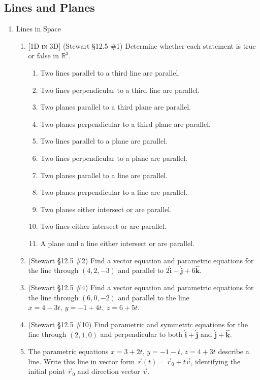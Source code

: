 \documentclass[12pt]{article}
\newcommand{\ihat}{\hat{\textbf{i}}}
\newcommand{\jhat}{\hat{\textbf{j}}}
\newcommand{\khat}{\hat{\textbf{k}}}
\newcommand{\dimtag}[1]{{\footnotesize\textsc{[#1]}}\;}
\newcounter{topic}
\begin{document}
\subsection*{Lines and Planes}
\begin{enumerate}\setcounter{enumi}{\value{topic}}

\item Lines in Space
    \begin{enumerate}
        \item \dimtag{1D in 3D} (Stewart \S12.5 \#1) Determine whether each statement is true or false in $\mathbb{R}^3$.
        \begin{enumerate}
            \item Two lines parallel to a third line are parallel.
            \item Two lines perpendicular to a third line are parallel.
            \item Two planes parallel to a third plane are parallel.
            \item Two planes perpendicular to a third plane are parallel.
            \item Two lines parallel to a plane are parallel.
            \item Two lines perpendicular to a plane are parallel.
            \item Two planes parallel to a line are parallel.
            \item Two planes perpendicular to a line are parallel.
            \item Two planes either intersect or are parallel.
            \item Two lines either intersect or are parallel.
            \item A plane and a line either intersect or are parallel.
        \end{enumerate}
        \item (Stewart \S12.5 \#2) Find a vector equation and parametric equations for the line through $(4,2,-3)$ and parallel to $2\ihat - \jhat + 6\khat$.
        \item (Stewart \S12.5 \#4) Find a vector equation and parametric equations for the line through $(6,0,-2)$ and parallel to the line $x=4-3t,\ y=-1+4t,\ z=6+5t$.
        \item (Stewart \S12.5 \#10) Find parametric and symmetric equations for the line through $(2,1,0)$ and perpendicular to both $\ihat + \jhat$ and $\jhat + \khat$.
        \item The parametric equations $x = 3 + 2t$, $y = -1 - t$, $z = 4 + 3t$ describe a line. Write this line in vector form $\vec{r}(t) = \vec{r}_0 + t\vec{v}$, identifying the initial point $\vec{r}_0$ and direction vector $\vec{v}$.

\end{enumerate}
\end{enumerate}
\end{document}
